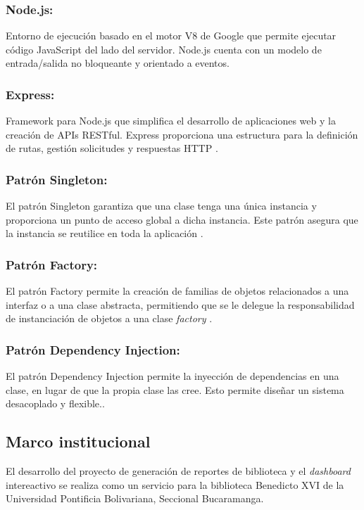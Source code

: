 \documentclass[spanish]{ieee_upb}
\begin{document}
  \subsubsection{Node.js:} Entorno de ejecución basado en el motor V8 de Google que permite ejecutar código JavaScript del lado del servidor. Node.js cuenta con un modelo de entrada/salida no bloqueante y orientado a eventos\cite{nodejs_2020}.
  
  \subsubsection{Express:} Framework para Node.js que simplifica el desarrollo de aplicaciones web y la creación de APIs RESTful. Express proporciona una estructura para la definición de  rutas, gestión solicitudes y respuestas HTTP \cite{express_framework_2020}.

    \subsubsection{Patrón Singleton:} El patrón Singleton garantiza que una clase tenga una única instancia y proporciona un punto de acceso global a dicha instancia. Este patrón asegura que la instancia se reutilice en toda la aplicación \cite{gamma1994design}.
  
  \subsubsection{Patrón Factory:} El patrón Factory permite la creación de familias de objetos relacionados a una interfaz o a una clase abstracta, permitiendo que se le delegue la responsabilidad de instanciación de objetos a una clase \textit{factory} \cite{gamma1994design}.

  \subsubsection{Patrón Dependency Injection:} El patrón Dependency Injection permite la inyección de dependencias en una clase, en lugar de que la propia clase las cree. Esto permite diseñar un sistema desacoplado y flexible.\cite{gamma1994design}.



\subsection{Marco institucional}


El desarrollo del proyecto de generación de reportes de biblioteca y el \textit{dashboard} intereactivo se realiza como un servicio para la biblioteca Benedicto XVI de la Universidad Pontificia Bolivariana, Seccional Bucaramanga.
\end{document}
